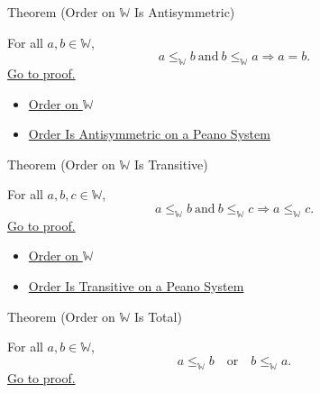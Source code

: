 \begin{theorembox}{Theorem (Order on \texorpdfstring{$\mathbb{W}$}{W} Is Antisymmetric)}
\begin{theorem}
\label{thm:order-on-w-antisymmetric}
For all $a,b\in\mathbb{W}$,
\[
a\leq_{\mathbb{W}}b\ \text{and}\ b\leq_{\mathbb{W}}a
\Longrightarrow a=b.
\]
\hyperref[prf:order-on-w-antisymmetric]{Go to proof.}
\end{theorem}
\end{theorembox}

\begin{dependencies}
\begin{itemize}
  \item \hyperref[def:order-on-w]{Order on $\mathbb{W}$}
  \item \hyperref[thm:order-antisymmetric-on-peano-system]{Order Is Antisymmetric on a Peano System}
\end{itemize}
\end{dependencies}

\begin{theorembox}{Theorem (Order on \texorpdfstring{$\mathbb{W}$}{W} Is Transitive)}
\begin{theorem}
\label{thm:order-on-w-transitive}
For all $a,b,c\in\mathbb{W}$,
\[
a\leq_{\mathbb{W}}b\ \text{and}\ b\leq_{\mathbb{W}}c
\Longrightarrow a\leq_{\mathbb{W}}c.
\]
\hyperref[prf:order-on-w-transitive]{Go to proof.}
\end{theorem}
\end{theorembox}

\begin{dependencies}
\begin{itemize}
  \item \hyperref[def:order-on-w]{Order on $\mathbb{W}$}
  \item \hyperref[thm:order-transitive-on-peano-system]{Order Is Transitive on a Peano System}
\end{itemize}
\end{dependencies}

\begin{theorembox}{Theorem (Order on \texorpdfstring{$\mathbb{W}$}{W} Is Total)}
\begin{theorem}
\label{thm:order-on-w-total}
For all $a,b\in\mathbb{W}$,
\[
a\leq_{\mathbb{W}}b
\quad\text{or}\quad
b\leq_{\mathbb{W}}a.
\]
\hyperref[prf:order-on-w-total]{Go to proof.}
\end{theorem}
\end{theorembox}

